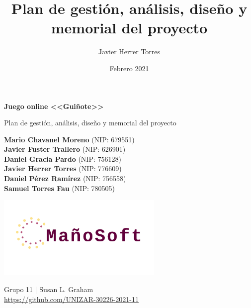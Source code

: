 \documentclass{article}
\title{Plan de gestión, análisis, diseño y memorial del proyecto}
\author{Javier Herrer Torres}
\date{Febrero 2021}
\begin{document}
\begin{titlepage}
    \begin{center}
        \vspace*{1cm}
            
        \Huge
        \textbf{Juego online <<Guiñote>>}
            
        \vspace{0.5cm}
        \LARGE
		Plan de gestión, análisis, diseño y memorial del proyecto
		
        \vspace{1.5cm}
            
        \textbf{Mario Chavanel Moreno} (NIP: 679551)\\
        \textbf{Javier Fuster Trallero} (NIP: 626901)\\
        \textbf{Daniel Gracia Pardo} (NIP: 756128)\\
        \textbf{Javier Herrer Torres} (NIP: 776609)\\
        \textbf{Daniel Pérez Ramírez} (NIP: 756558)\\
        \textbf{Samuel Torres Fau} (NIP: 780505)
        
        \vfill
            
    	\includegraphics[width=0.6\textwidth]{../images/logo}
            
        \vspace{1.5cm}
            
        
         Grupo 11 | Susan L. Graham\\
        \href{https://github.com/UNIZAR-30226-2021-11}{https://github.com/UNIZAR-30226-2021-11}
            
        \vspace{1.5cm}
 
    \end{center}
\end{titlepage}

\tableofcontents

\break
\end{document}
